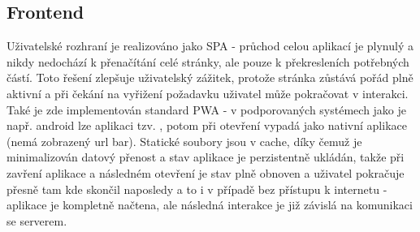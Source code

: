 \subsection{Frontend}
Uživatelské rozhraní je realizováno jako SPA - průchod celou aplikací je plynulý a nikdy nedochází k přenačítání celé stránky, ale pouze k překresleních potřebných částí. Toto řešení zlepšuje uživatelský zážitek, protože stránka zůstává pořád plně aktivní a při čekání na vyřižení požadavku uživatel může pokračovat v interakci. Také je zde implementován standard PWA - v podporovaných systémech jako je např. android lze aplikaci tzv. , potom při otevření vypadá jako nativní aplikace (nemá zobrazený url bar). Statické soubory jsou v cache, díky čemuž je minimalizován datový přenost a stav aplikace je perzistentně ukládán, takže při zavření aplikace a následném otevření je stav plně obnoven a uživatel pokračuje přesně tam kde skončil naposledy a to i v případě bez přístupu k internetu - aplikace je kompletně načtena, ale následná interakce je již závislá na komunikaci se serverem.

